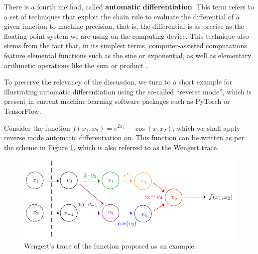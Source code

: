 \documentclass[12pt]{report} %
\begin{document}
There is a fourth method, called \textbf{automatic differentiation}. This term refers to a set of techniques that exploit the chain rule to evaluate the differential of a given function to machine precision, that is, the differential is as precise as the floating point system we are using on the computing device. This technique also stems from the fact that, in its simplest terms, computer-assisted computations feature elemental functions such as the sine or exponential, as well as elementary arithmetic operations like the sum or product \cite{verma2000introduction}.

To preserve the relevancy of the discussion, we turn to a short example for illustrating automatic differentiation using the so-called ``reverse mode'', which is present in current machine learning software packages such as PyTorch or TensorFlow.

Consider the function $f (x_1, x_2) = e^{2 x_1} - \cos (x_1 x_2)$, which we
shall apply reverse mode automatic differentiation on. This function can be
written as per the scheme in Figure \ref{fig:wengert-trace}, which is also referred to
as the Wengert trace.

\begin{figure}[ht]
  \centering
  \includegraphics[width=\textwidth]{imagenes/wengert-trace.pdf}
  \caption{Wengert's trace of the function proposed as an example.}
  \label{fig:wengert-trace}
\end{figure}
\end{document}
